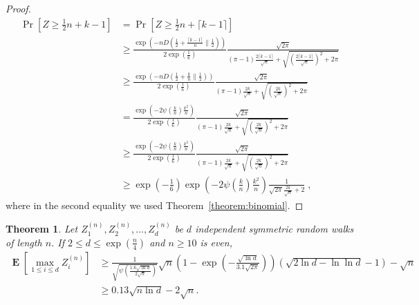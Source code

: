 \documentclass{article}
\DeclareMathOperator*{\Exp}{\mathbf{E}}
\newtheorem{theorem}{Theorem}
\begin{document}
\begin{proof}
\begin{align*}
\Pr \left[ Z \ge  \frac{1}{2} n + k-1 \right]
& = \Pr \left[ Z \ge \frac{1}{2} n + \lceil k - 1\rceil \right] \\
& \ge \frac{\exp\left(-n D(\frac{1}{2}+\frac{\lceil k -1\rceil}{n} \| \frac{1}{2})\right)}{2 \exp\left(\frac{1}{6}\right)} \frac{\sqrt{2 \pi}}{(\pi-1)\frac{2\lceil k -1\rceil}{\sqrt{n}}+\sqrt{\left(\frac{2\lceil k -1\rceil}{\sqrt{n}}\right)^2+2 \pi}} \\
& \ge \frac{\exp\left(-n D(\frac{1}{2}+\frac{k}{n} \| \frac{1}{2})\right)}{2 \exp\left(\frac{1}{6}\right)} \frac{\sqrt{2 \pi}}{(\pi-1)\frac{2k}{\sqrt{n}}+\sqrt{\left(\frac{2k}{\sqrt{n}}\right)^2+2 \pi}} \\
& = \frac{\exp\left(- 2 \psi(\frac{k}{n}) \frac{k^2}{n} \right)}{2 \exp\left(\frac{1}{6}\right)} \frac{\sqrt{2 \pi}}{(\pi-1)\frac{2k}{\sqrt{n}}+\sqrt{\left(\frac{2k}{\sqrt{n}}\right)^2+2 \pi}} \\
& \ge \frac{\exp\left(- 2 \psi(\frac{k}{n}) \frac{k^2}{n} \right)}{2 \exp\left(\frac{1}{6}\right)} \frac{\sqrt{2 \pi}}{(\pi-1)\frac{2k}{\sqrt{n}}+\sqrt{\left(\frac{2k}{\sqrt{n}}\right)^2+2 \pi}} \\
& \ge \exp\left(-\frac{1}{6}\right) \exp\left(- 2 \psi\left(\frac{k}{n}\right) \frac{k^2}{n} \right) \frac{1}{\sqrt{2\pi} \frac{2 k}{\sqrt{n}} + 2} \; ,
\end{align*}
where in the second equality we used Theorem~\ref{theorem:binomial}.
\end{proof}

\begin{theorem}
\label{theorem:maximum-of-random-walks}
Let $Z^{(n)}_1, Z^{(n)}_2, \dots, Z^{(n)}_d$ be $d$ independent symmetric random walks of length $n$. If $2 \le d \le \exp(\frac{n}{4})$ and $n\ge 10$ is even,
\begin{align*}
\Exp \left[ \max_{1 \le i \le d} Z^{(n)}_i \right]
& \ge \frac{1}{\sqrt{\psi\left(\frac{1.6\sqrt{\ln d}}{2 \sqrt{n}}\right)}}\sqrt{n}\left(1 - \exp\left(-\frac{\sqrt{\ln d}}{3.1 \sqrt{2\pi}}\right)\right) \left(\sqrt{2 \ln d -\ln \ln d}-1\right) -\sqrt{n} \\
& \ge 0.13 \sqrt{n \ln d} - 2 \sqrt{n}.
\end{align*}
\end{theorem}
\end{document}
